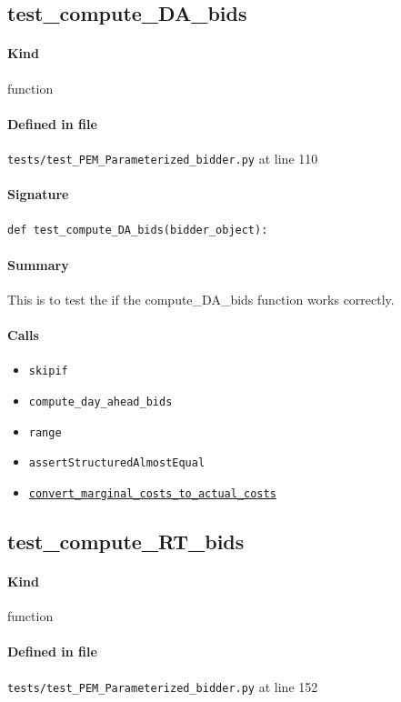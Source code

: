 \documentclass[11pt]{report}
\begin{document}
\subsection{test\_compute\_DA\_bids}
\label{def:tests-test_PEM_Parameterized_bidder.py:test_compute_DA_bids:L110}
\paragraph{Kind} function
\paragraph{Defined in file} \texttt{tests/test\_PEM\_Parameterized\_bidder.py} at line 110
\paragraph{Signature} \texttt{def test\_compute\_DA\_bids(bidder\_object):}
\paragraph{Summary} This is to test the if the compute\_DA\_bids function works correctly.
\paragraph{Calls}
\begin{itemize}[leftmargin=*]
  \item \texttt{skipif}
  \item \texttt{compute\_day\_ahead\_bids}
  \item \texttt{range}
  \item \texttt{assertStructuredAlmostEqual}
  \item \hyperref[def:utils.py:convert_marginal_costs_to_actual_costs:L15]{\texttt{convert\_marginal\_costs\_to\_actual\_costs}}
\end{itemize}
\subsection{test\_compute\_RT\_bids}
\label{def:tests-test_PEM_Parameterized_bidder.py:test_compute_RT_bids:L152}
\paragraph{Kind} function
\paragraph{Defined in file} \texttt{tests/test\_PEM\_Parameterized\_bidder.py} at line 152
\end{document}

